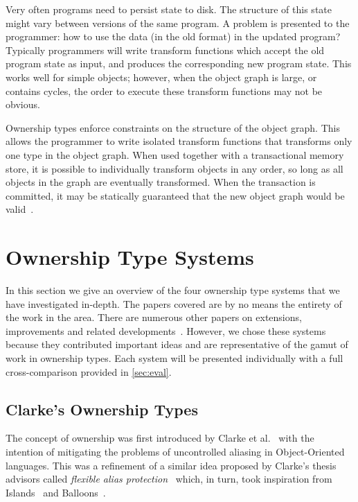 \documentclass{acm_proc_article-sp}
\begin{document}
Very often programs need to persist state to disk. The structure of this state
might vary between versions of the same program. A problem is presented to the
programmer: how to use the data (in the old format) in the updated program?
Typically programmers will write transform functions which accept the old
program state as input, and produces the corresponding new program state. This
works well for simple objects; however, when the object graph is large, or
contains cycles, the order to execute these transform functions may not be
obvious.

Ownership types enforce constraints on the structure of the object graph. This
allows the programmer to write isolated transform functions that transforms only
one type in the object graph. When used together with a transactional memory
store, it is possible to individually transform objects in any order, so long as
all objects in the graph are eventually transformed. When the transaction is
committed, it may be statically guaranteed that the new object graph would be
valid~\cite{boyapati04safejava,boyapati03innerclass}.

\section{Ownership Type Systems}
\label{sec:systems}

In this section we give an overview of the four ownership type systems that we
have investigated in-depth. The papers covered are by no means the entirety of
the work in the area. There are numerous other papers on extensions,
improvements and related developments~\cite{clarke13survey}. However, we chose
these systems because they contributed important ideas and are
representative of the gamut of work in ownership types. Each system will be
presented individually with a full cross-comparison provided in \cref{sec:eval}.

\subsection{Clarke's Ownership Types}
\label{subsec:clarke}

The concept of ownership was first introduced by Clarke et
al.~\cite{clarke98ownership,clarke01ownership} with the intention of
mitigating the problems of uncontrolled aliasing in Object-Oriented languages.
This was a refinement of a similar idea proposed by Clarke's thesis advisors
called \emph{flexible alias protection}~\cite{noble98alias} which, in turn,
took inspiration from Islands~\cite{hogg91islands} and
Balloons~\cite{almeida97balloons}.
\end{document}
